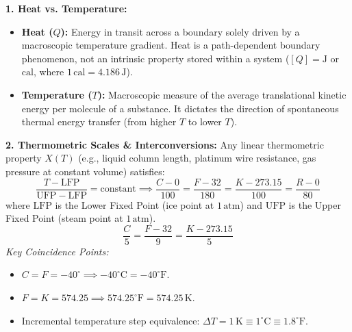 \documentclass[10pt,twoside,openright]{book}
\begin{document}
\begin{conceptbox}
\textbf{1. Heat vs. Temperature:}
\begin{itemize}
  \item \textbf{Heat ($Q$):} Energy in transit across a boundary solely driven by a macroscopic temperature gradient. Heat is a path-dependent boundary phenomenon, not an intrinsic property stored within a system ($[Q] = \mathrm{J}$ or $\mathrm{cal}$, where $1\,\mathrm{cal} = 4.186\,\mathrm{J}$).
  \item \textbf{Temperature ($T$):} Macroscopic measure of the average translational kinetic energy per molecule of a substance. It dictates the direction of spontaneous thermal energy transfer (from higher $T$ to lower $T$).
\end{itemize}
\textbf{2. Thermometric Scales \& Interconversions:}
Any linear thermometric property $X(T)$ (e.g., liquid column length, platinum wire resistance, gas pressure at constant volume) satisfies:
\begin{equation}
  \frac{T - \mathrm{LFP}}{\mathrm{UFP} - \mathrm{LFP}} = \text{constant} \implies \frac{C - 0}{100} = \frac{F - 32}{180} = \frac{K - 273.15}{100} = \frac{R - 0}{80}
\end{equation}
where $\mathrm{LFP}$ is the Lower Fixed Point (ice point at $1\,\mathrm{atm}$) and $\mathrm{UFP}$ is the Upper Fixed Point (steam point at $1\,\mathrm{atm}$).
\begin{equation}
  \frac{C}{5} = \frac{F - 32}{9} = \frac{K - 273.15}{5}
\end{equation}
\textit{Key Coincidence Points:}
\begin{itemize}
  \item $C = F = -40^\circ \implies -40^\circ\mathrm{C} = -40^\circ\mathrm{F}$.
  \item $F = K = 574.25 \implies 574.25^\circ\mathrm{F} = 574.25\,\mathrm{K}$.
  \item Incremental temperature step equivalence: $\Delta T = 1\,\mathrm{K} \equiv 1^\circ\mathrm{C} \equiv 1.8^\circ\mathrm{F}$.
\end{itemize}
\end{conceptbox}
\end{document}
